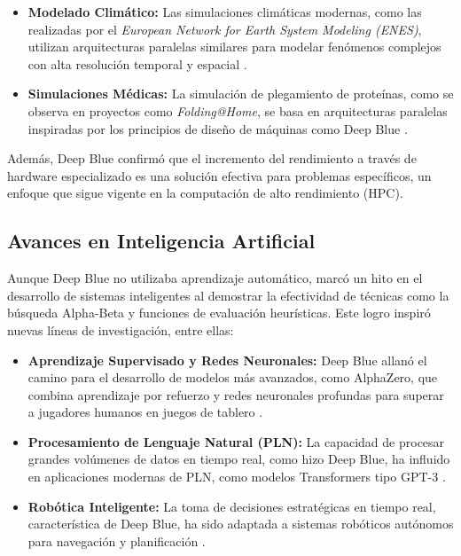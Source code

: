 \documentclass[12pt,a4paper]{article}
\begin{document}
\begin{itemize}
    \item \textbf{Modelado Climático:} Las simulaciones climáticas modernas, como las realizadas por el \textit{European Network for Earth System Modeling (ENES)}, utilizan arquitecturas paralelas similares para modelar fenómenos complejos con alta resolución temporal y espacial \cite{andre2014high}.
    \item \textbf{Simulaciones Médicas:} La simulación de plegamiento de proteínas, como se observa en proyectos como \textit{Folding@Home}, se basa en arquitecturas paralelas inspiradas por los principios de diseño de máquinas como Deep Blue \cite{larson2009folding}.
\end{itemize}

Además, Deep Blue confirmó que el incremento del rendimiento a través de hardware especializado es una solución efectiva para problemas específicos, un enfoque que sigue vigente en la computación de alto rendimiento (HPC).

\subsection{Avances en Inteligencia Artificial}

Aunque Deep Blue no utilizaba aprendizaje automático, marcó un hito en el desarrollo de sistemas inteligentes al demostrar la efectividad de técnicas como la búsqueda Alpha-Beta y funciones de evaluación heurísticas. Este logro inspiró nuevas líneas de investigación, entre ellas:

\begin{itemize}
    \item \textbf{Aprendizaje Supervisado y Redes Neuronales:} Deep Blue allanó el camino para el desarrollo de modelos más avanzados, como AlphaZero, que combina aprendizaje por refuerzo y redes neuronales profundas para superar a jugadores humanos en juegos de tablero \cite{silver2018general}.
    \item \textbf{Procesamiento de Lenguaje Natural (PLN):} La capacidad de procesar grandes volúmenes de datos en tiempo real, como hizo Deep Blue, ha influido en aplicaciones modernas de PLN, como modelos Transformers tipo GPT-3 \cite{brown2020language}.
    \item \textbf{Robótica Inteligente:} La toma de decisiones estratégicas en tiempo real, característica de Deep Blue, ha sido adaptada a sistemas robóticos autónomos para navegación y planificación \cite{kober2013reinforcement}.
\end{itemize}
\end{document}
